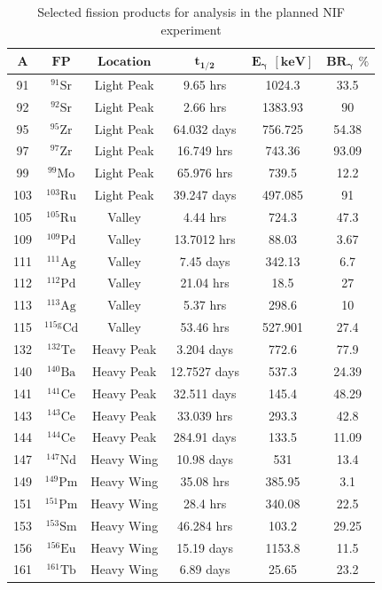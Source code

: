\begin{table}[htb!]
	\centering
	\setlength\extrarowheight{2.5pt}
	\renewcommand{\tabcolsep}{10pt}
	\caption{Selected fission products for analysis in the planned NIF experiment}
	\label{table:fpstable}
	\begin{tabular}{|c|c|c|c|c|c|}
		\hline
		$\mathbf{A}$ & $\mathbf{FP}$ & $\mathbf{Location}$ & $\mathbf{t_{1/2}}$ & $\mathbf{E_{\gamma}}$ $\mathbf{[keV]}$ & $\mathbf{BR_{\gamma}}$ $\boldsymbol{\%}$ \\ \hline
		91 & $\mathrm{^{91}Sr}$ & Light Peak & 9.65 hrs & 1024.3 & 33.5 \\ \hline
		92 & $\mathrm{^{92}Sr}$ & Light Peak & 2.66 hrs & 1383.93 & 90 \\ \hline
		95 & $\mathrm{^{95}Zr}$ & Light Peak & 64.032 days & 756.725 & 54.38 \\ \hline
		97 & $\mathrm{^{97}Zr}$ & Light Peak & 16.749 hrs & 743.36 & 93.09 \\ \hline
		99 & $\mathrm{^{99}Mo}$ & Light Peak & 65.976 hrs & 739.5 & 12.2 \\ \hline
		103 & $\mathrm{^{103}Ru}$ & Light Peak & 39.247 days & 497.085 & 91 \\ \hline
		105 & $\mathrm{^{105}Ru}$ & Valley & 4.44 hrs & 724.3 & 47.3 \\ \hline
		109 & $\mathrm{^{109}Pd}$ & Valley & 13.7012 hrs & 88.03 & 3.67 \\ \hline
		111 & $\mathrm{^{111}Ag}$ & Valley & 7.45 days & 342.13 & 6.7 \\ \hline
		112 & $\mathrm{^{112}Pd}$ & Valley & 21.04 hrs & 18.5 & 27 \\ \hline
		113 & $\mathrm{^{113}Ag}$ & Valley & 5.37 hrs & 298.6 & 10 \\ \hline
		115 & $\mathrm{^{115g}Cd}$ & Valley & 53.46 hrs & 527.901 & 27.4 \\ \hline
		132 & $\mathrm{^{132}Te}$ & Heavy Peak & 3.204 days & 772.6 & 77.9 \\ \hline
		140 & $\mathrm{^{140}Ba}$ & Heavy Peak & 12.7527 days & 537.3 & 24.39 \\ \hline
		141 & $\mathrm{^{141}Ce}$ & Heavy Peak & 32.511 days & 145.4 & 48.29 \\ \hline
		143 & $\mathrm{^{143}Ce}$ & Heavy Peak & 33.039 hrs & 293.3 & 42.8 \\ \hline
		144 & $\mathrm{^{144}Ce}$ & Heavy Peak & 284.91 days & 133.5 & 11.09 \\ \hline
		147 & $\mathrm{^{147}Nd}$ & Heavy Wing & 10.98 days & 531 & 13.4 \\ \hline
		149 & $\mathrm{^{149}Pm}$ & Heavy Wing & 35.08 hrs & 385.95 & 3.1 \\ \hline
		151 & $\mathrm{^{151}Pm}$ & Heavy Wing & 28.4 hrs & 340.08 & 22.5 \\ \hline
		153 & $\mathrm{^{153}Sm}$ & Heavy Wing & 46.284 hrs & 103.2 & 29.25 \\ \hline
		156 & $\mathrm{^{156}Eu}$ & Heavy Wing & 15.19 days & 1153.8 & 11.5 \\ \hline
		161 & $\mathrm{^{161}Tb}$ & Heavy Wing & 6.89 days & 25.65 & 23.2 \\ \hline
	\end{tabular}
\end{table}
	
